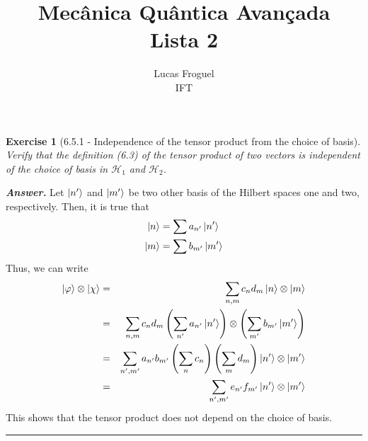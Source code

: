 \documentclass[12pt]{article}
\title{Mecânica Quântica Avançada \\ Lista 2}
\author{Lucas Froguel \\ IFT}
\date{}
\def\be{\begin{equation}}
\def\ee{\end{equation}}
\def\bea{\begin{eqnarray*}}
\def\eea{\end{eqnarray*}}
\def\l{\left}
\def\r{\right}
\newtheorem{exercise}{Exercise}
\newenvironment{answer}{\noindent\textbf{\textit{Answer.}} \normalfont }{\par\noindent\rule{\textwidth}{0.4pt}}
\begin{document}
	\maketitle
	\listoftheorems[title={List of Exercises}]
	
	\begin{exercise}[6.5.1 - Independence of the tensor product from the choice of basis] \label{LM}
		Verify that the definition (6.3) of the tensor product of two vectors is independent of the choice of basis in $\mathcal{H}_1$ and $\mathcal{H}_2$.
	\end{exercise}
	\begin{answer}
		Let $\ket{n'}$ and $\ket{m'}$ be two other basis of the Hilbert spaces one and two, respectively. Then, it is true that
		\be
			\begin{aligned}
				\ket{n} &= \sum a_{n'}\ket{n'} \\
				\ket{m} &= \sum b_{m'}\ket{m'}
			\end{aligned}	
		\ee	
		Thus, we can write
		\bea
			\ket{\varphi}\otimes\ket{\chi} &=& \sum_{n, m} c_nd_m\ket{n}\otimes\ket{m} \\ 
				&=& \sum_{n, m} c_nd_m \l(\sum_{n'} a_{n'}\ket{n'}\r) \otimes \l(\sum_{m'}b_{m'}\ket{m'} \r) \\
				&=& \sum_{n', m'} a_{n'}b_{m'} \l(\sum_n c_n \r) \l(\sum_m d_m\r) \ket{n'}\otimes\ket{m'} \\
				&=& \sum_{n', m'} e_{n'} f_{m'} \ket{n'}\otimes\ket{m'}
		\eea
		This shows that the tensor product does not depend on the choice of basis.		
	\end{answer}
\end{document}
